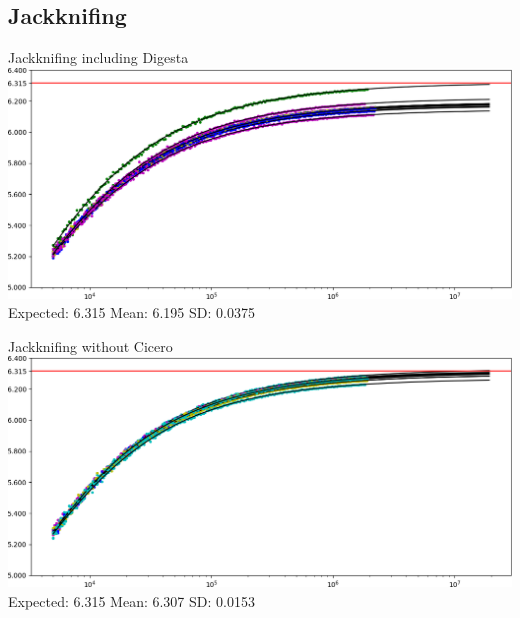 \documentclass{beamer}
\begin{document}
\subsection{Jackknifing}
\begin{frame}{Jackknifing including Digesta}
\includegraphics[width=\linewidth]{jk_digesta}
Expected: 6.315 Mean: 6.195 SD: 0.0375
\end{frame}

\begin{frame}{Jackknifing without Cicero}
\includegraphics[width=\linewidth]{jk_core}
Expected: 6.315 Mean: 6.307 SD: 0.0153
\end{frame}
\end{document}
